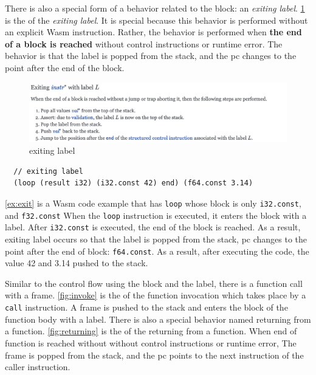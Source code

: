There is also a special form of a behavior related to the block: an
\textit{exiting label}.
\cref{fig:exiting-label} is the \officialp{} of the \textit{exiting label}.
It is special because this behavior is performed without an explicit
Wasm instruction.
Rather, the behavior is performed when \textbf{the end of a block is reached}
without control instructions or runtime error.
The behavior is that the label is popped from the stack, and the pc changes to
the point after the end of the block.

\begin{figure}[h!]
    \centerline{\includegraphics[width=15cm]{fig/exiting}}
    \caption[Enter the caption title here]{exiting label} \label{fig:exiting-label}
\end{figure}


\begin{example}
\label{ex:exit}
\begin{verbatim}
  // exiting label
  (loop (result i32) (i32.const 42) end) (f64.const 3.14)
\end{verbatim}
\end{example}

\cref{ex:exit} is a Wasm code example that has \texttt{loop} whose block is
only \texttt{i32.const}, and \texttt{f32.const}
When the \texttt{loop} instruction is executed, it enters the block with a label.
After \texttt{i32.const} is executed, the end of the block is reached.
As a result, exiting label occurs so that the label is popped from the stack,
pc changes to the point after the end of block: \texttt{f64.const}.
As a result, after executing the code, the value 42 and 3.14 pushed to the
stack.


Similar to the control flow using the block and the label, there is a function
call with a frame.
\cref{fig:invoke} is the \officialp{} of the function invocation which takes
place by a \texttt{call} instruction.
A frame is pushed to the stack and enters the block of the function body with a
label.
There is also a special behavior named returning from a function.
\cref{fig:returning} is the \officialp{} of the returning from a function.
When end of function is reached without without control instructions or runtime
error, The frame is popped from the stack, and the pc points to the next
instruction of the caller instruction.

